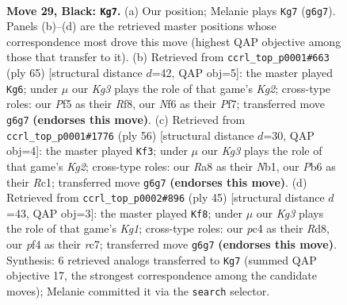 \documentclass[11pt]{article}
\begin{document}
\clearpage

\begin{figure}[p]\centering
\begin{subfigure}{0.46\textwidth}\centering
\resizebox{\linewidth}{!}{%
\newchessgame
\chessboard[
  setfen={r7/pbpp4/1p3nkp/5p2/2P2P2/NP1K4/P2PB2P/R7 b - - 4 29},
  showmover=false,
  pgfstyle=straightmove, color=movearrow, markmove={g6-g7}
]}
\caption{}
\end{subfigure}\hfill
\begin{subfigure}{0.46\textwidth}\centering
\resizebox{\linewidth}{!}{%
\newchessgame
\chessboard[
  setfen={5r2/2p2pk1/1p6/5np1/p6p/2P2P2/PP1NRKPP/8 b - - 1 33},
  showmover=false,
  pgfstyle=straightmove, color=movearrow, markmove={g7-g6}
]}
\caption{}
\end{subfigure}
\\[4pt]
\begin{subfigure}{0.46\textwidth}\centering
\resizebox{\linewidth}{!}{%
\newchessgame
\chessboard[
  setfen={r7/1p3pk1/n3pbpp/3p4/3P4/BP2P1PP/5PK1/1NR5 w - - 2 29},
  showmover=false,
  pgfstyle=straightmove, color=movearrow, markmove={g2-f3}
]}
\caption{}
\end{subfigure}\hfill
\begin{subfigure}{0.46\textwidth}\centering
\resizebox{\linewidth}{!}{%
\newchessgame
\chessboard[
  setfen={3r2k1/2R1bppp/p7/1p6/1n2N3/1P2P1P1/1P2P1BP/6K1 b - - 1 23},
  showmover=false,
  pgfstyle=straightmove, color=movearrow, markmove={g8-f8}
]}
\caption{}
\end{subfigure}
\caption{\textbf{Move 29, Black: \texttt{Kg7}.} (a) Our position; Melanie plays \texttt{Kg7} (\texttt{g6g7}). Panels (b)--(d) are the retrieved master positions whose correspondence most drove this move (highest QAP objective among those that transfer to it). (b) Retrieved from \texttt{ccrl\_top\_p0001\#663} (ply 65) [structural distance $d$=42, QAP obj=5]: the master played \texttt{Kg6}; under $\mu$ our \emph{Kg3} plays the role of that game's \emph{Kg2}; cross-type roles: our \emph{P}f5 as their \emph{R}f8, our \emph{N}f6 as their \emph{P}f7; transferred move \texttt{g6g7} \textbf{(endorses this move)}. (c) Retrieved from \texttt{ccrl\_top\_p0001\#1776} (ply 56) [structural distance $d$=30, QAP obj=4]: the master played \texttt{Kf3}; under $\mu$ our \emph{Kg3} plays the role of that game's \emph{Kg2}; cross-type roles: our \emph{R}a8 as their \emph{N}b1, our \emph{P}b6 as their \emph{R}c1; transferred move \texttt{g6g7} \textbf{(endorses this move)}. (d) Retrieved from \texttt{ccrl\_top\_p0002\#896} (ply 45) [structural distance $d$=43, QAP obj=3]: the master played \texttt{Kf8}; under $\mu$ our \emph{Kg3} plays the role of that game's \emph{Kg1}; cross-type roles: our \emph{p}c4 as their \emph{R}d8, our \emph{p}f4 as their \emph{r}c7; transferred move \texttt{g6g7} \textbf{(endorses this move)}. Synthesis: 6 retrieved analogs transferred to \texttt{Kg7} (summed QAP objective 17, the strongest correspondence among the candidate moves); Melanie committed it via the \texttt{search} selector.}
\label{fig:thought-m57}
\end{figure}
\end{document}

